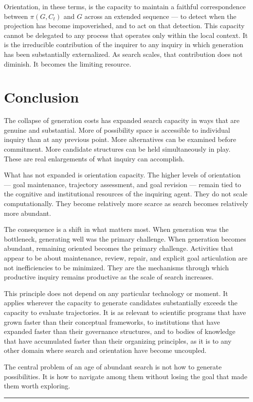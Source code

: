 Orientation, in these terms, is the capacity to maintain a faithful correspondence
between $\pi(G, C_t)$ and $G$ across an extended sequence --- to detect when
the projection has become impoverished, and to act on that detection. This
capacity cannot be delegated to any process that operates only within the local
context. It is the irreducible contribution of the inquirer to any inquiry in
which generation has been substantially externalized. As search scales, that
contribution does not diminish. It becomes the limiting resource.

\section*{Conclusion}

The collapse of generation costs has expanded search capacity in ways that are
genuine and substantial. More of possibility space is accessible to individual
inquiry than at any previous point. More alternatives can be examined before
commitment. More candidate structures can be held simultaneously in play. These
are real enlargements of what inquiry can accomplish.

What has not expanded is orientation capacity. The higher levels of
orientation --- goal maintenance, trajectory assessment, and goal revision
--- remain tied to the cognitive and institutional resources of the inquiring
agent. They do not scale computationally. They become relatively more scarce
as search becomes relatively more abundant.

The consequence is a shift in what matters most. When generation was the
bottleneck, generating well was the primary challenge. When generation becomes
abundant, remaining oriented becomes the primary challenge. Activities that
appear to be about maintenance, review, repair, and explicit goal articulation
are not inefficiencies to be minimized. They are the mechanisms through which
productive inquiry remains productive as the scale of search increases.

This principle does not depend on any particular technology or moment. It applies
wherever the capacity to generate candidates substantially exceeds the capacity
to evaluate trajectories. It is as relevant to scientific programs that have
grown faster than their conceptual frameworks, to institutions that have expanded
faster than their governance structures, and to bodies of knowledge that have
accumulated faster than their organizing principles, as it is to any other
domain where search and orientation have become uncoupled.

The central problem of an age of abundant search is not how to generate
possibilities. It is how to navigate among them without losing the goal that
made them worth exploring.

\bigskip
\begin{center}
  \rule{0.4\textwidth}{0.4pt}
\end{center}

